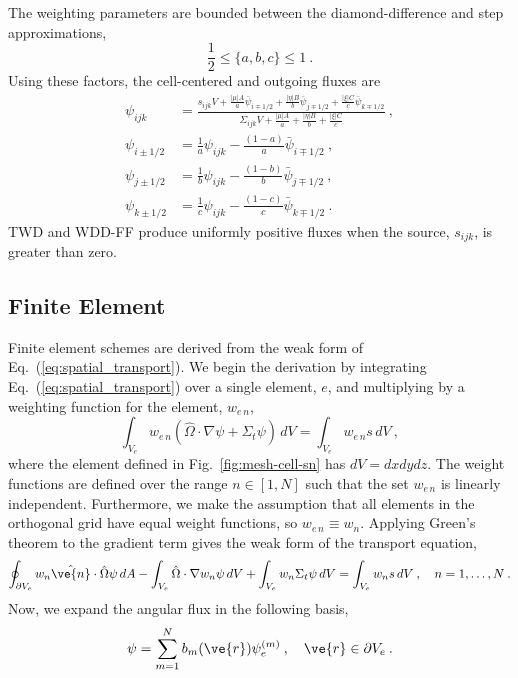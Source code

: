 \documentclass[12pt]{article}
\newcommand{\vOmega}{\ensuremath{\hat{\Omega}}}
\begin{document}
The weighting parameters are bounded between the diamond-difference and step
approximations,
\begin{equation}
  \frac{1}{2}\le\{a,b,c\}\le 1\:.
\end{equation}
Using these factors, the cell-centered and outgoing fluxes are
\begin{equation}
  \begin{aligned}
    \psi_{ijk} &= \frac{s_{ijk}V + \frac{|\mu|A}{a}\bar{\psi}_{i\mp1/2} +
      \frac{|\eta|B}{b}\bar{\psi}_{j\mp1/2} +
      \frac{|\xi|C}{c}\bar{\psi}_{k\mp1/2}}{\Sigma_{ijk}V + \frac{|\mu|A}{a} +
      \frac{|\eta|B}{b} + \frac{|\xi|C}{c}}\:,\\
    \psi_{i\pm1/2} &= \frac{1}{a}\psi_{ijk}-
    \frac{(1-a)}{a}\bar{\psi}_{i\mp1/2}\:,\\
    \psi_{j\pm1/2} &= \frac{1}{b}\psi_{ijk}-
    \frac{(1-b)}{b}\bar{\psi}_{j\mp1/2}\:,\\
    \psi_{k\pm1/2} &= \frac{1}{c}\psi_{ijk}-
    \frac{(1-c)}{c}\bar{\psi}_{k\mp1/2}\:.
  \end{aligned}
  \label{eq:twd}
\end{equation}
TWD and WDD-FF produce uniformly positive fluxes when the source, $s_{ijk}$,
is greater than zero.


\subsection*{Finite Element}
Finite element schemes are derived from the weak form of
Eq.~(\ref{eq:spatial_transport}). We begin the derivation by
integrating Eq.~(\ref{eq:spatial_transport}) over a single element, $e$, and
multiplying by a weighting function for the element, $w_{e\,n}$,
\begin{equation}
  \int_{V_e} w_{e\,n}(\vOmega\cdot\nabla\psi+\Sigma_t\psi)\,dV =
  \int_{V_e} w_{e\,n}s\,dV\:,
\end{equation}
where the element defined in Fig.~\ref{fig:mesh-cell-sn} has $dV=dxdydz$.  The
weight functions are defined over the range $n\in[1,N]$ such that the set
$w_{e\,n}$ is linearly independent.  Furthermore, we make the assumption that
all elements in the orthogonal grid have equal weight functions, so
$w_{e\,n}\equiv w_n$.  Applying Green's theorem to the gradient term gives the
weak form of the transport equation,
\begin{equation}
  \oint_{\partial V_e}w_n\hat{\ve{n}}\cdot\vOmega\psi\,dA -
  \int_{V_e}\vOmega\cdot\nabla w_n\psi\,dV + \int_{V_e} w_n\Sigma_t\psi\,dV =
  \int_{V_e}w_ns\,dV\:, \quad n=1,\ldots,N\:.
  \label{eq:weak-form}
\end{equation}
Now, we expand the angular flux in the following basis,
\begin{equation}
  \psi = \sum_{m=1}^{N}b_m(\ve{r})\psi_e^{(m)}\:,\quad
  \ve{r}\in\partial V_e\:.
  \label{eq:psi_fe_expansion}
\end{equation}
\end{document}
